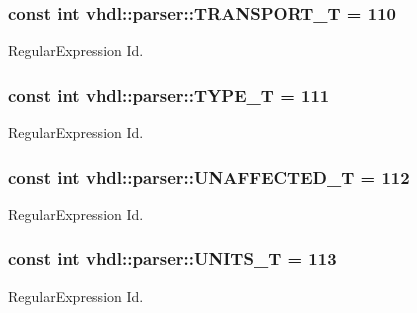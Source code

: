 \subsubsection[{T\+R\+A\+N\+S\+P\+O\+R\+T\+\_\+\+T}]{\setlength{\rightskip}{0pt plus 5cm}const int vhdl\+::parser\+::\+T\+R\+A\+N\+S\+P\+O\+R\+T\+\_\+\+T = 110}\label{namespacevhdl_1_1parser_ad8ed05c3a8f328bb862adf5cdb68b390}
Regular\+Expression Id. \hypertarget{namespacevhdl_1_1parser_a672468abbd6e9840d84c4d483873efe5}{}
\subsubsection[{T\+Y\+P\+E\+\_\+\+T}]{\setlength{\rightskip}{0pt plus 5cm}const int vhdl\+::parser\+::\+T\+Y\+P\+E\+\_\+\+T = 111}\label{namespacevhdl_1_1parser_a672468abbd6e9840d84c4d483873efe5}
Regular\+Expression Id. \hypertarget{namespacevhdl_1_1parser_ae8ef154cc60d62388209f8b4ff31d01f}{}
\subsubsection[{U\+N\+A\+F\+F\+E\+C\+T\+E\+D\+\_\+\+T}]{\setlength{\rightskip}{0pt plus 5cm}const int vhdl\+::parser\+::\+U\+N\+A\+F\+F\+E\+C\+T\+E\+D\+\_\+\+T = 112}\label{namespacevhdl_1_1parser_ae8ef154cc60d62388209f8b4ff31d01f}
Regular\+Expression Id. \hypertarget{namespacevhdl_1_1parser_aae950039986a2acfc1ea4c868f1c87cb}{}
\subsubsection[{U\+N\+I\+T\+S\+\_\+\+T}]{\setlength{\rightskip}{0pt plus 5cm}const int vhdl\+::parser\+::\+U\+N\+I\+T\+S\+\_\+\+T = 113}\label{namespacevhdl_1_1parser_aae950039986a2acfc1ea4c868f1c87cb}
Regular\+Expression Id. \hypertarget{namespacevhdl_1_1parser_a095564f2876a826044035b58ea856640}{}
